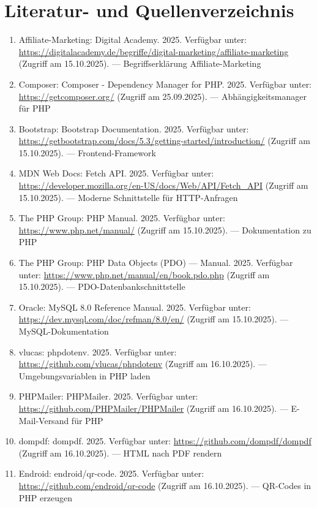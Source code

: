 \section*{Literatur- und Quellenverzeichnis}
\begin{enumerate}
  \item Affiliate-Marketing: Digital Academy. 2025. Verfügbar unter: \url{https://digitalacademy.de/begriffe/digital-marketing/affiliate-marketing} (Zugriff am 15.10.2025). — Begriffserklärung Affiliate-Marketing
  \item Composer: Composer - Dependency Manager for PHP. 2025. Verfügbar unter: \url{https://getcomposer.org/} (Zugriff am 25.09.2025). — Abhängigkeitsmanager für PHP
  \item Bootstrap: Bootstrap Documentation. 2025. Verfügbar unter: \url{https://getbootstrap.com/docs/5.3/getting-started/introduction/} (Zugriff am 15.10.2025). — Frontend-Framework
  \item MDN Web Docs: Fetch API. 2025. Verfügbar unter: \url{https://developer.mozilla.org/en-US/docs/Web/API/Fetch_API} (Zugriff am 15.10.2025). — Moderne Schnittstelle für HTTP-Anfragen
  \item The PHP Group: PHP Manual. 2025. Verfügbar unter: \url{https://www.php.net/manual/} (Zugriff am 15.10.2025). — Dokumentation zu PHP
  \item The PHP Group: PHP Data Objects (PDO) — Manual. 2025. Verfügbar unter: \url{https://www.php.net/manual/en/book.pdo.php} (Zugriff am 15.10.2025). — PDO-Datenbankschnittstelle
  \item Oracle: MySQL 8.0 Reference Manual. 2025. Verfügbar unter: \url{https://dev.mysql.com/doc/refman/8.0/en/} (Zugriff am 15.10.2025). — MySQL-Dokumentation
  \item vlucas: phpdotenv. 2025. Verfügbar unter: \url{https://github.com/vlucas/phpdotenv} (Zugriff am 16.10.2025). — Umgebungsvariablen in PHP laden
  \item PHPMailer: PHPMailer. 2025. Verfügbar unter: \url{https://github.com/PHPMailer/PHPMailer} (Zugriff am 16.10.2025). — E-Mail-Versand für PHP
  \item dompdf: dompdf. 2025. Verfügbar unter: \url{https://github.com/dompdf/dompdf} (Zugriff am 16.10.2025). — HTML nach PDF rendern
  \item Endroid: endroid/qr-code. 2025. Verfügbar unter: \url{https://github.com/endroid/qr-code} (Zugriff am 16.10.2025). — QR-Codes in PHP erzeugen

\end{enumerate}

